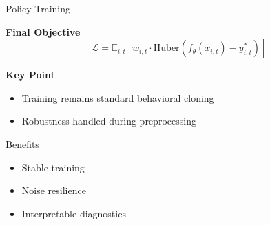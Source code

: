 \begin{frame}{Policy Training}

    \textbf{Final Objective}
    \[
        \mathcal{L}
        =
        \mathbb{E}_{i,t}
        \left[
            w_{i,t}
            \cdot
            \mathrm{Huber}
            \left(
                f_\theta(x_{i,t}) - y^*_{i,t}
            \right)
        \right]
    \]

    \vspace{1em}

    \textbf{Key Point}
    \begin{itemize}
        \item Training remains standard behavioral cloning
        \item Robustness handled during preprocessing
    \end{itemize}

    \vspace{1em}

    \begin{block}{Benefits}
        \begin{itemize}
            \item Stable training
            \item Noise resilience
            \item Interpretable diagnostics
        \end{itemize}
    \end{block}

\end{frame}

